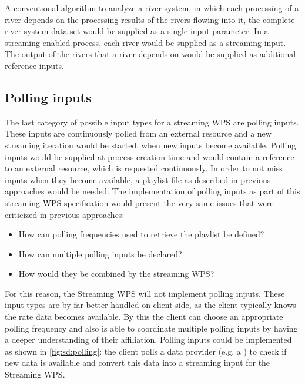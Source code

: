       A conventional algorithm to analyze a river system, in which each processing of a river depends on the processing results of the rivers flowing into it, the complete river system data set would be supplied as a single input parameter. In a streaming enabled process, each river would be supplied as a streaming input. The output of the rivers that a river depends on would be supplied as additional reference inputs.

    \subsection{Polling inputs}
      \label{sec:stream:input:polling}
      The last category of possible input types for a streaming \ac{WPS} are polling inputs. These inputs are continuously polled from an external resource and a new streaming iteration would be started, when new inputs become available. Polling inputs would be supplied at process creation time and would contain a reference to an external resource, which is requested continuously. In order to not miss inputs when they become available, a playlist file as described in previous approaches \citep{foerster2012live} would be needed. The implementation of polling inputs as part of this streaming \ac{WPS} specification would present the very same issues that were criticized in previous approaches:
      \begin{itemize}
        \item How can polling frequencies used to retrieve the playlist be defined?
        \item How can multiple polling inputs be declared?
        \item How would they be combined by the streaming \ac{WPS}?
      \end{itemize}
      For this reason, the Streaming \ac{WPS} will not implement polling inputs. These input types are by far better handled on client side, as the client typically knows the rate data becomes available. By this the client can choose an appropriate polling frequency and also is able to coordinate multiple polling inputs by having a deeper understanding of their affiliation. Polling inputs could be implemented as shown in \cref{fig:sd:polling}: the client polls a data provider (e.g. a ) to check if new data is available and convert this data into a streaming input for the Streaming \ac{WPS}.

